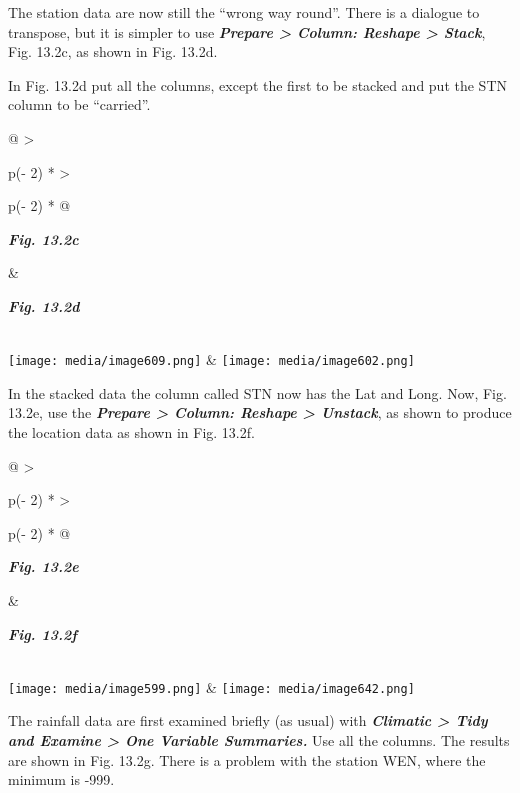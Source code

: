 \documentclass[
  letterpaper,
  DIV=11,
  numbers=noendperiod]{scrreprt}
\begin{document}
The station data are now still the ``wrong way round''. There is a
dialogue to transpose, but it is simpler to use \textbf{\emph{Prepare
\textgreater{} Column: Reshape \textgreater{} Stack}}, Fig. 13.2c, as
shown in Fig. 13.2d.

In Fig. 13.2d put all the columns, except the first to be stacked and
put the STN column to be ``carried''.

\begin{longtable}[]{@{}
  >{\raggedright\arraybackslash}p{(\columnwidth - 2\tabcolsep) * }
  >{\raggedright\arraybackslash}p{(\columnwidth - 2\tabcolsep) * }@{}}
\toprule\noalign{}
\begin{minipage}[b]{\linewidth}\raggedright
\textbf{\emph{Fig. 13.2c}}
\end{minipage} & \begin{minipage}[b]{\linewidth}\raggedright
\textbf{\emph{Fig. 13.2d}}
\end{minipage} \\
\midrule\noalign{}
\endhead
\bottomrule\noalign{}
\endlastfoot
\texttt{[image: media/image609.png]} &
\texttt{[image: media/image602.png]} \\
\end{longtable}

In the stacked data the column called STN now has the Lat and Long. Now,
Fig. 13.2e, use the \textbf{\emph{Prepare \textgreater{} Column: Reshape
\textgreater{} Unstack}}, as shown to produce the location data as shown
in Fig. 13.2f.

\begin{longtable}[]{@{}
  >{\raggedright\arraybackslash}p{(\columnwidth - 2\tabcolsep) * }
  >{\raggedright\arraybackslash}p{(\columnwidth - 2\tabcolsep) * }@{}}
\toprule\noalign{}
\begin{minipage}[b]{\linewidth}\raggedright
\textbf{\emph{Fig. 13.2e}}
\end{minipage} & \begin{minipage}[b]{\linewidth}\raggedright
\textbf{\emph{Fig. 13.2f}}
\end{minipage} \\
\midrule\noalign{}
\endhead
\bottomrule\noalign{}
\endlastfoot
\texttt{[image: media/image599.png]} &
\texttt{[image: media/image642.png]} \\
\end{longtable}

The rainfall data are first examined briefly (as usual) with
\textbf{\emph{Climatic \textgreater{} Tidy and Examine \textgreater{}
One Variable Summaries.}} Use all the columns. The results are shown in
Fig. 13.2g. There is a problem with the station WEN, where the minimum
is -999.
\end{document}
